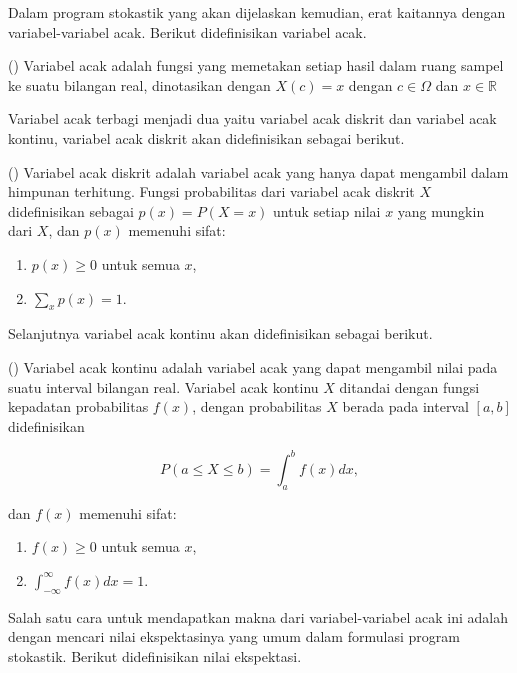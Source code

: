 Dalam program stokastik yang akan dijelaskan kemudian, erat kaitannya dengan variabel-variabel acak. Berikut didefinisikan variabel acak.

\begin{definisi}()
    Variabel acak adalah fungsi yang memetakan setiap hasil dalam ruang sampel ke suatu bilangan real, dinotasikan dengan $X(c)=x$ dengan $c \in \Omega$ dan $x\in \mathbb{R}$
\end{definisi}

Variabel acak terbagi menjadi dua yaitu variabel acak diskrit dan variabel acak kontinu, variabel acak diskrit akan didefinisikan sebagai berikut.

\begin{definisi}()
    Variabel acak diskrit adalah variabel acak yang hanya dapat mengambil dalam himpunan terhitung. Fungsi probabilitas dari variabel acak diskrit $X$ didefinisikan sebagai $p(x) = P(X = x)$ untuk setiap nilai $x$ yang mungkin dari $X$, dan $p(x)$ memenuhi sifat:
    \begin{enumerate}
        \item $p(x)\geq0$ untuk semua $x$,
        \item $\sum_x p(x)=1$.
    \end{enumerate}
\end{definisi}

Selanjutnya variabel acak kontinu akan didefinisikan sebagai berikut.

\begin{definisi}()
    Variabel acak kontinu adalah variabel acak yang dapat mengambil nilai pada suatu interval bilangan real. Variabel acak kontinu $X$ ditandai dengan fungsi kepadatan probabilitas $f(x)$, dengan probabilitas $X$ berada pada interval $[a,b]$ didefinisikan
    
    $$P(a \leq X \leq b) = \int_a^b f(x) dx,$$

    \noindent dan $f(x)$ memenuhi sifat:
    \begin{enumerate}
        \item $f(x) \geq 0$ untuk semua $x$,
        \item $\int_{-\infty}^{\infty} f(x) dx = 1$.
    \end{enumerate}
\end{definisi}

Salah satu cara untuk mendapatkan makna dari variabel-variabel acak ini adalah dengan mencari nilai ekspektasinya yang umum dalam formulasi program stokastik. Berikut didefinisikan nilai ekspektasi.


